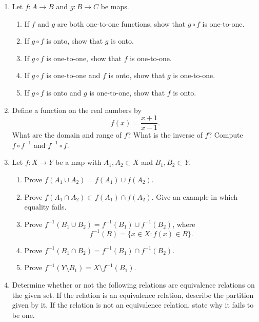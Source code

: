 {\begin{enumerate}
\item
Let $f : A \rightarrow B$ and $g : B \rightarrow C$ be maps.
\begin{enumerate}
 
\item
If $f$ and $g$ are both one-to-one functions, show that $g \circ f$
is one-to-one. 
 
\item
If $g \circ f$ is onto, show that $g$ is onto.
 
\item
If $g \circ f$ is one-to-one, show that $f$ is one-to-one.
 
\item
If $g \circ f$ is one-to-one and $f$ is onto, show that $g$ is
one-to-one.
 
\item
If $g \circ f$ is onto and $g$ is one-to-one, show that $f$ is onto.
 
\end{enumerate}
 
\item
Define a function on the real numbers by
\[
f(x) = \frac{x + 1}{x - 1}.
\]
What are the domain and range of $f$? What is the inverse of $f$?  Compute $f \circ f^{-1}$ and $f^{-1} \circ f$. 
 
\item
Let $f: X \rightarrow Y$ be a map with $A_1, A_2 \subset X$ and $B_1, B_2 \subset Y$. 
\begin{enumerate}
 
\item
Prove $f( A_1 \cup A_2 ) = f( A_1) \cup f( A_2 )$.
 
\item
Prove $f( A_1 \cap A_2 ) \subset f( A_1) \cap f( A_2 )$.  Give an example in which equality fails.
 
\item
Prove $f^{-1}( B_1 \cup B_2 ) = f^{-1}( B_1) \cup f^{-1}(B_2 )$, where
\[
f^{-1}(B) = \{ x \in X : f(x) \in B \}.
\]
 
\item
Prove $f^{-1}( B_1 \cap B_2 ) = f^{-1}( B_1) \cap f^{-1}( B_2 )$. 
 
\item
Prove $f^{-1}( Y \setminus B_1 ) = X \setminus f^{-1}( B_1)$.
 
\end{enumerate}
 
\item
Determine whether or not the following relations are equivalence relations on the given set.  If the relation is an equivalence relation, describe the partition given by it.  If the relation is not an equivalence relation, state why it fails to be one.
\begin{multicols}{2}
\begin{enumerate}
 

\end{enumerate}
\end{multicols}
\end{enumerate}}
